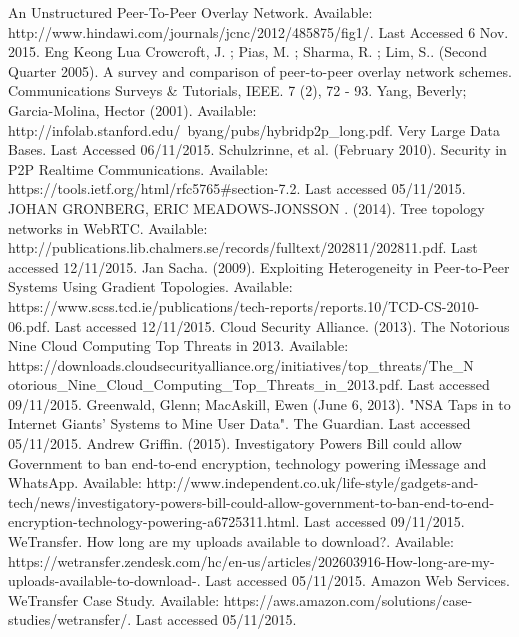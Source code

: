 \documentclass[]{report}
\begin{document}
					
	\begin{thebibliography}{20}
		An Unstructured Peer-To-Peer Overlay Network. Available: http://www.hindawi.com/journals/jcnc/2012/485875/fig1/. Last Accessed 6 Nov. 2015.
		Eng Keong Lua Crowcroft, J. ; Pias, M. ; Sharma, R. ; Lim, S.. (Second Quarter 2005). A survey and comparison of peer-to-peer overlay network schemes. Communications Surveys \& Tutorials, IEEE. 7 (2), 72 - 93.
		Yang, Beverly; Garcia-Molina, Hector (2001). Available: http://infolab.stanford.edu/~byang/pubs/hybridp2p\_long.pdf. Very Large Data Bases. Last Accessed 06/11/2015.
		Schulzrinne, et al. (February 2010). Security in P2P Realtime Communications. Available: https://tools.ietf.org/html/rfc5765\#section-7.2. Last accessed 05/11/2015.
		JOHAN GRONBERG, ERIC MEADOWS-JONSSON . (2014). Tree topology networks in WebRTC. Available: http://publications.lib.chalmers.se/records/fulltext/202811/202811.pdf. Last accessed 12/11/2015.
		Jan Sacha. (2009). Exploiting Heterogeneity in Peer-to-Peer Systems Using Gradient Topologies. Available: https://www.scss.tcd.ie/publications/tech-reports/reports.10/TCD-CS-2010-06.pdf. Last accessed 12/11/2015.
		Cloud Security Alliance. (2013). The Notorious Nine Cloud Computing Top Threats in 2013. Available: https://downloads.cloudsecurityalliance.org/initiatives/top\_threats/The\_N\\otorious\_Nine\_Cloud\_Computing\_Top\_Threats\_in\_2013.pdf. Last accessed 09/11/2015.
		Greenwald, Glenn; MacAskill, Ewen (June 6, 2013). "NSA Taps in to Internet Giants' Systems to Mine User Data". The Guardian.  Last accessed 05/11/2015.
		Andrew Griffin. (2015). Investigatory Powers Bill could allow Government to ban end-to-end encryption, technology powering iMessage and WhatsApp. Available: http://www.independent.co.uk/life-style/gadgets-and-tech/news/investigatory-powers-bill-could-allow-government-to-ban-end-to-end-encryption-technology-powering-a6725311.html. Last accessed 09/11/2015.
		WeTransfer. How long are my uploads available to download?. Available: https://wetransfer.zendesk.com/hc/en-us/articles/202603916-How-long-are-my-uploads-available-to-download-. Last accessed 05/11/2015.
		Amazon Web Services. WeTransfer Case Study. Available: https://aws.amazon.com/solutions/case-studies/wetransfer/. Last accessed 05/11/2015.

\end{thebibliography}
\end{document}
